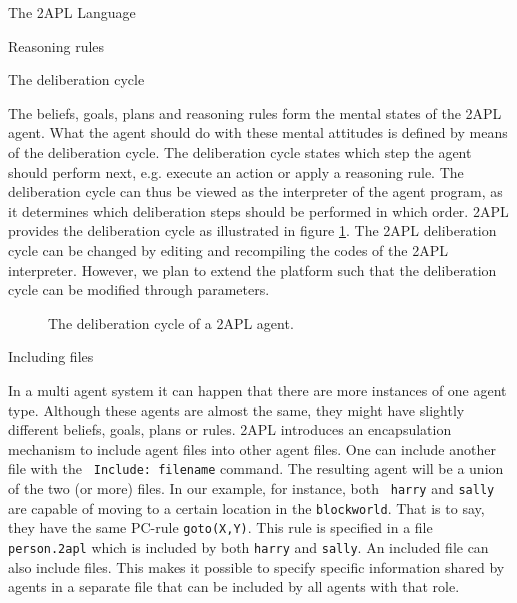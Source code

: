 \begin{chapter}{The 2APL Language}
\begin{section}{Reasoning rules}
\begin{subsection}
\end{subsection}
\end{section}


\begin{section}{The deliberation cycle}

The beliefs, goals, plans and reasoning rules form the mental states
of the 2APL agent. What the agent should do with these mental
attitudes is defined by means of the deliberation cycle. The
deliberation cycle states which step the agent should perform next,
e.g. execute an action or apply a reasoning rule. The deliberation
cycle can thus be viewed as the interpreter of the agent program, as
it determines which deliberation steps should be performed in which
order. 2APL provides the deliberation cycle as illustrated in figure
\ref{fig:delib}. The 2APL deliberation cycle can be changed by
editing and recompiling the codes of the 2APL interpreter. However,
we plan to extend the platform such that the deliberation cycle can
be modified through parameters.

\begin{figure}[ht]
    \caption{The deliberation cycle of a 2APL agent.}\label{fig:delib}
\end{figure}

\end{section}


\begin{section}{Including files}\label{sec:include}

In a multi agent system it can happen that there are more instances
of one agent type. Although these agents are almost the same, they
might have slightly different beliefs, goals, plans or rules. 2APL
introduces an encapsulation mechanism to include agent files into
other agent files. One can include another file with the {\tt
Include: filename} command. The resulting agent will be a union of
the two (or more) files. In our example, for instance, both {\tt
harry} and {\tt sally} are capable of moving to a certain location
in the {\tt blockworld}. That is to say, they have the same PC-rule
{\tt goto(X,Y)}. This rule is specified in a file {\tt person.2apl}
which is included by both {\tt harry} and {\tt sally}. An included
file can also include files. This makes it possible to specify
specific information shared by agents in a separate file that can be
included by all agents with that role.
\end{section}
\end{chapter}
